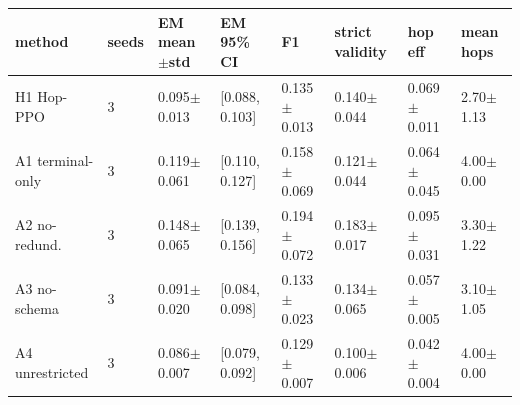 \begin{tabular}{llllllll}
\toprule
method & seeds & EM mean$\pm$std & EM 95\% CI & F1 & strict validity & hop eff & mean hops \\
\midrule
H1 Hop-PPO & 3 & 0.095$\pm$0.013 & [0.088, 0.103] & 0.135$\pm$0.013 & 0.140$\pm$0.044 & 0.069$\pm$0.011 & 2.70$\pm$1.13 \\
A1 terminal-only & 3 & 0.119$\pm$0.061 & [0.110, 0.127] & 0.158$\pm$0.069 & 0.121$\pm$0.044 & 0.064$\pm$0.045 & 4.00$\pm$0.00 \\
A2 no-redund. & 3 & 0.148$\pm$0.065 & [0.139, 0.156] & 0.194$\pm$0.072 & 0.183$\pm$0.017 & 0.095$\pm$0.031 & 3.30$\pm$1.22 \\
A3 no-schema & 3 & 0.091$\pm$0.020 & [0.084, 0.098] & 0.133$\pm$0.023 & 0.134$\pm$0.065 & 0.057$\pm$0.005 & 3.10$\pm$1.05 \\
A4 unrestricted & 3 & 0.086$\pm$0.007 & [0.079, 0.092] & 0.129$\pm$0.007 & 0.100$\pm$0.006 & 0.042$\pm$0.004 & 4.00$\pm$0.00 \\
\bottomrule
\end{tabular}
